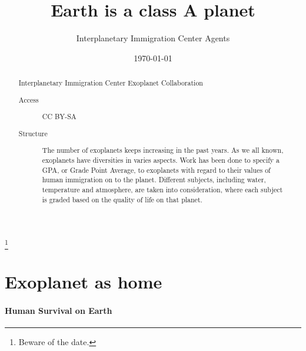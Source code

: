\documentclass[%
 reprint,
 amsmath,amssymb,
 aps,
]{revtex4-1}
\begin{document}
\preprint{}

\title{Earth is a class A planet}%
\thanks{Beware of the date.}%

\author{Interplanetary Immigration Center Agents}
%


\date{\today}%

\begin{abstract}
Interplanetary Immigration Center Exoplanet Collaboration
\begin{description}
\item[Access] CC BY-SA
\item[Structure]
The number of exoplanets keeps increasing in the past years. As we all known, exoplanets have diversities in varies aspects. Work has been done to specify a GPA, or Grade Point Average, to exoplanets with regard to their values of human immigration on to the planet. Different subjects, including water, temperature and atmosphere, are taken into consideration, where each subject is graded based on the quality of life on that planet.
\end{description}
\end{abstract}

\maketitle


\section{\label{sec:level1}Exoplanet as home}



\paragraph{Human Survival on Earth}
\end{document}
